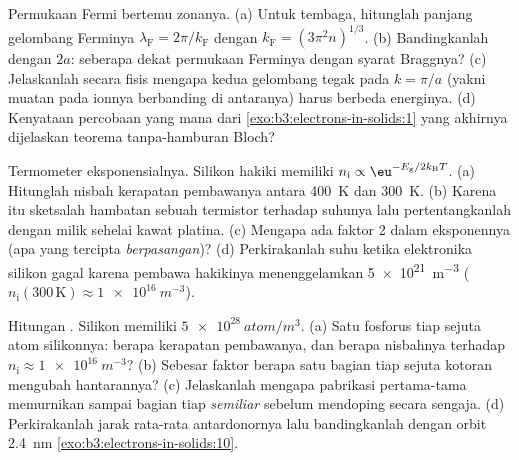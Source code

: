 \begin{exercise}[$\star\star$]\label{exo:b3:electrons-in-solids:7}
Permukaan Fermi bertemu zonanya. (a) Untuk tembaga, hitunglah
panjang gelombang Ferminya $\lambda_{\text{F}} = 2\pi/k_{\text{F}}$ dengan
$k_{\text{F}} = (3\pi^2n)^{1/3}$. (b) Bandingkanlah dengan $2a$: seberapa
dekat permukaan Ferminya dengan syarat Braggnya? (c) Jelaskanlah
secara fisis mengapa kedua gelombang tegak pada $k = \pi/a$ (yakni muatan pada
ionnya berbanding di antaranya) harus berbeda energinya. (d) Kenyataan
percobaan yang mana dari \cref{exo:b3:electrons-in-solids:1} yang
akhirnya dijelaskan teorema tanpa-hamburan Bloch?
\end{exercise}

\begin{exercise}[$\star\star$]\label{exo:b3:electrons-in-solids:8}
Termometer eksponensialnya. Silikon hakiki memiliki $n_{\text{i}}
\propto \eu^{-E_{\text{g}}/2k_{\text{B}}T}$. (a) Hitunglah
nisbah kerapatan pembawanya antara \qty{400}{K} dan \qty{300}{K}. (b)
Karena itu sketsalah hambatan sebuah termistor terhadap suhunya lalu
pertentangkanlah dengan milik sehelai kawat platina. (c) Mengapa ada faktor 2 dalam
eksponennya (apa yang tercipta \emph{berpasangan})? (d) Perkirakanlah
suhu ketika elektronika silikon gagal karena pembawa hakikinya
menenggelamkan  \qty{5e21}{m^{-3}}
($n_{\text{i}}(300\,\text{K}) \approx \qty{1e16}{m^{-3}}$).
\end{exercise}

\begin{exercise}[$\star\star$]\label{exo:b3:electrons-in-solids:9}
Hitungan . Silikon memiliki $\qty{5e28}{atom/m^3}$. (a) Satu
fosforus tiap sejuta atom silikonnya: berapa kerapatan pembawanya, dan
berapa nisbahnya terhadap $n_{\text{i}} \approx \qty{1e16}{m^{-3}}$? (b) Sebesar
faktor berapa satu bagian tiap sejuta kotoran mengubah hantarannya? (c)
Jelaskanlah mengapa pabrikasi  pertama-tama memurnikan sampai bagian
tiap \emph{semiliar} sebelum mendoping secara sengaja. (d) Perkirakanlah
jarak rata-rata antardonornya lalu bandingkanlah dengan
orbit \qty{2.4}{nm} \cref{exo:b3:electrons-in-solids:10}.
\end{exercise}

